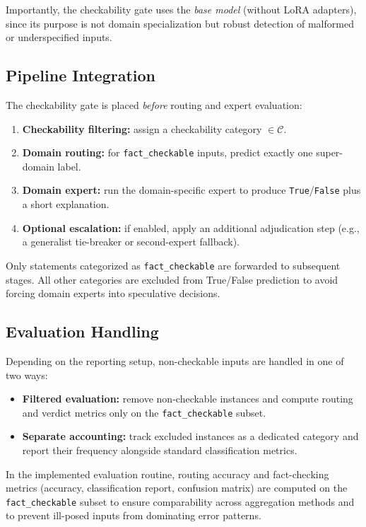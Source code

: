 Importantly, the checkability gate uses the \emph{base model} (without LoRA adapters), since its purpose is not domain specialization but robust detection of malformed or underspecified inputs.

\subsection{Pipeline Integration}
The checkability gate is placed \emph{before} routing and expert evaluation:
\begin{enumerate}
    \item \textbf{Checkability filtering:} assign a checkability category $\in \mathcal{C}$.
    \item \textbf{Domain routing:} for \texttt{fact\_checkable} inputs, predict exactly one super-domain label.
    \item \textbf{Domain expert:} run the domain-specific expert to produce \texttt{True}/\texttt{False} plus a short explanation.
    \item \textbf{Optional escalation:} if enabled, apply an additional adjudication step (e.g., a generalist tie-breaker or second-expert fallback).
\end{enumerate}

Only statements categorized as \texttt{fact\_checkable} are forwarded to subsequent stages.
All other categories are excluded from True/False prediction to avoid forcing domain experts into speculative decisions.

\subsection{Evaluation Handling}
Depending on the reporting setup, non-checkable inputs are handled in one of two ways:
\begin{itemize}
    \item \textbf{Filtered evaluation:} remove non-checkable instances and compute routing and verdict metrics only on the \texttt{fact\_checkable} subset.
    \item \textbf{Separate accounting:} track excluded instances as a dedicated category and report their frequency alongside standard classification metrics.
\end{itemize}

In the implemented evaluation routine, routing accuracy and fact-checking metrics (accuracy, classification report, confusion matrix) are computed on the \texttt{fact\_checkable} subset to ensure comparability across aggregation methods and to prevent ill-posed inputs from dominating error patterns.

